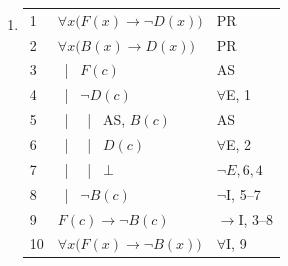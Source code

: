 \documentclass{article}
\newcommand{\asbar}{\ | \ }
\begin{document}
\begin{enumerate}
          \vspace{6pt}

    \item %
          \begin{tabular}{l|p{8cm}l}
              \hline
              1  & $\forall x\big(F(x)\to\neg D(x)\big)$ & PR            \\
              2  & $\forall x\big(B(x)\to D(x)\big)$     & PR            \\
              3  & \asbar $F(c)$                         & AS            \\
              4  & \asbar $\neg D(c)$                    & $\forall$E, 1 \\
              5  & \asbar \asbar AS, $B(c)$              & AS            \\
              6  & \asbar \asbar $D(c)$                  & $\forall$E, 2 \\
              7  & \asbar \asbar $\bot$                  & $\neg E, 6,4$ \\
              8  & \asbar $\neg B(c)$                    & $\neg$I, 5--7 \\
              9  & $F(c)\to\neg B(c)$                    & $\to$I, 3--8  \\
              10 & $\forall x\big(F(x)\to\neg B(x)\big)$ & $\forall$I, 9 \\
              \hline
          \end{tabular}

          \vspace{6pt}


\end{enumerate}
\end{document}
